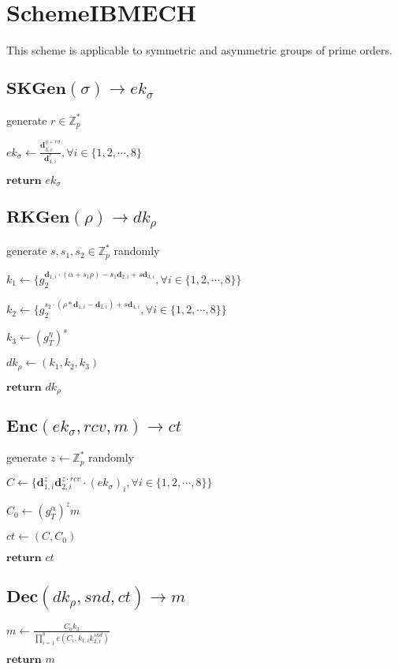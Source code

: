 \documentclass[a4paper]{article}
\begin{document}
\section{SchemeIBMECH}

This scheme is applicable to symmetric and asymmetric groups of prime orders. 

\subsection{$\textbf{SKGen}(\sigma) \rightarrow \textit{ek}_\sigma$}

generate $r \in \mathbb{Z}_p^*$

$\textit{ek}_\sigma \gets \frac{\bm{d}_{3, i}^{\eta + r \sigma}}{\bm{d}_{4, i}^r}, \forall i \in \{1, 2, \cdots, 8\}$

$\textbf{return }\textit{ek}_\sigma$

\subsection{$\textbf{RKGen}(\rho) \rightarrow \textit{dk}_\rho$}

generate $s, s_1, s_2 \in \mathbb{Z}_p^*$ randomly

$k_1 \gets \{g_2^{\bm{d}_{1, i} \cdot (\alpha + s_1 \rho) - s_1 \bm{d}_{2, i} + s \bm{d}_{3, i}}, \forall i \in \{1, 2, \cdots, 8\}\}$

$k_2 \gets \{g_2^{s_2 \cdot (\rho * \bm{d}_{1, i} - \bm{d}_{2, i}) + s \bm{d}_{4, i}}, \forall i \in \{1, 2, \cdots, 8\}\}$

$k_3 \gets (g_T^\eta)^s$

$\textit{dk}_\rho \gets (k_1, k_2, k_3)$

$\textbf{return }\textit{dk}_\rho$

\subsection{$\textbf{Enc}(\textit{ek}_\sigma, \textit{rcv}, m) \rightarrow \textit{ct}$}

generate $z \gets \mathbb{Z}_p^*$ randomly

$C \gets \{\bm{d}_{1, i}^z \bm{d}_{2, i}^{z \cdot \textit{rcv}} \cdot (\textit{ek}_\sigma)_i, \forall i \in \{1, 2, \cdots, 8\}\}$

$C_0 \gets (g_T^\alpha)^z m$

$\textit{ct} \gets (C, C_0)$

$\textbf{return }\textit{ct}$

\subsection{$\textbf{Dec}(\textit{dk}_\rho, \textit{snd}, \textit{ct}) \rightarrow m$}

$m \gets \frac{C_0 k_3}{\prod\limits_{i = 1}^8 e(C_i, k_{1, i} k_{2, i}^\textit{snd})}$

$\textbf{return }m$
\end{document}
